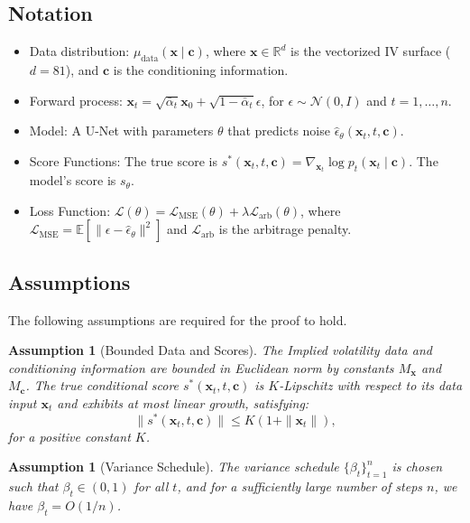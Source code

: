 \documentclass{article}
\newtheorem{assumption}[theorem]{Assumption}
\begin{document}
\subsection{Notation}
\begin{itemize}
    \item Data distribution: $\mu_{\text{data}}(\mathbf{x} \mid \mathbf{c})$, where $\mathbf{x} \in \mathbb{R}^d$ is the vectorized IV surface ($d=81$), and $\mathbf{c}$ is the conditioning information.
    \item Forward process: $\mathbf{x}_t = \sqrt{\bar{\alpha}_t} \mathbf{x}_0 + \sqrt{1 - \bar{\alpha}_t} \epsilon$, for $\epsilon \sim \mathcal{N}(0, I)$ and $t=1, \dots, n$.
    \item Model: A U-Net with parameters $\theta$ that predicts noise $\hat{\epsilon}_\theta(\mathbf{x}_t, t, \mathbf{c})$.
    \item Score Functions: The true score is $s^*(\mathbf{x}_t, t, \mathbf{c}) = \nabla_{\mathbf{x}_t} \log p_t(\mathbf{x}_t \mid \mathbf{c})$. The model's score is $s_\theta$.
    \item Loss Function: $\mathcal{L}(\theta) = \mathcal{L}_{\text{MSE}}(\theta) + \lambda \mathcal{L}_{\text{arb}}(\theta)$, where $\mathcal{L}_{\text{MSE}} = \mathbb{E} [ \| \epsilon - \hat{\epsilon}_\theta \|^2 ]$ and $\mathcal{L}_{\text{arb}}$ is the arbitrage penalty.
\end{itemize}

\subsection{Assumptions}
The following assumptions are required for the proof to hold.

\begin{assumption}[Bounded Data and Scores] \label{ass:bounded_data}
The Implied volatility data and conditioning information are bounded in Euclidean norm by constants $M_\mathbf{x}$ and $M_\mathbf{c}$. The true conditional score $s^*(\mathbf{x}_t, t, \mathbf{c})$ is $K$-Lipschitz with respect to its data input $\mathbf{x}_t$ and exhibits at most linear growth, satisfying:
\[
\|s^*(\mathbf{x}_t, t, \mathbf{c})\| \le K(1 + \|\mathbf{x}_t\|),
\]
for a positive constant $K$.
\end{assumption}

\begin{assumption}[Variance Schedule] \label{ass:schedule}
The variance schedule $\{\beta_t\}_{t=1}^n$ is chosen such that $\beta_t \in (0,1)$ for all $t$, and for a sufficiently large number of steps $n$, we have $\beta_t = O(1/n)$.
\end{assumption}
\end{document}
